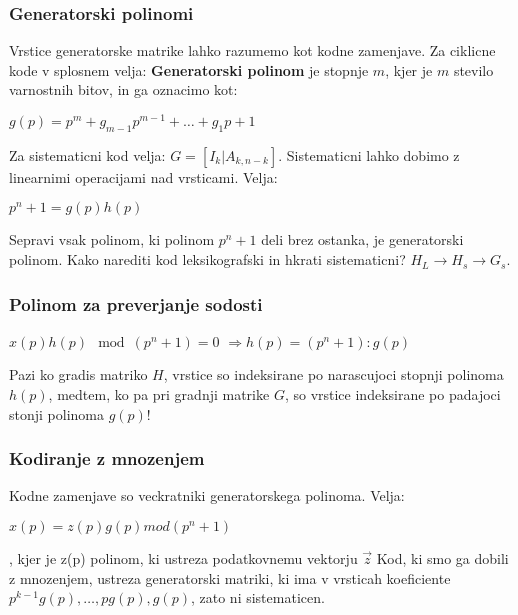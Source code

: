\documentclass{article}
\begin{document}
\begin{multicols}{4}
\subsubsection{Generatorski polinomi}
Vrstice generatorske matrike lahko razumemo kot kodne zamenjave.
Za ciklicne kode v splosnem velja: \textbf{Generatorski polinom} je stopnje $m$, kjer je $m$ stevilo
varnostnih bitov, in ga oznacimo kot:
\begin{center}
    \begin{math}
        g(p) = p^m + g_{m-1}p^{m-1} + \dots + g_1p + 1
    \end{math}
\end{center}
Za sistematicni kod velja: $G = [I_k | A_{k, n-k}]$.
Sistematicni lahko dobimo z linearnimi operacijami nad vrsticami.
Velja:
\begin{center}
    \begin{math}
        p^n + 1 = g(p)h(p)
    \end{math}
\end{center}
Sepravi vsak polinom, ki polinom $p^n + 1$ deli brez ostanka, je generatorski polinom.
Kako narediti kod leksikografski in hkrati sistematicni? $H_L \rightarrow H_s \rightarrow G_s$.

\subsubsection{Polinom za preverjanje sodosti}
\begin{center}
    \begin{math}
        x(p)h(p) \mod(p^n + 1) = 0   
    \end{math}
    \begin{math}
        \Rightarrow h(p) = (p^n + 1) : g(p)
    \end{math}
\end{center}
Pazi ko gradis matriko $H$, vrstice so indeksirane po narascujoci stopnji polinoma $h(p)$, medtem,
ko pa pri gradnji matrike $G$, so vrstice indeksirane po padajoci stonji polinoma $g(p)$!


\subsubsection{Kodiranje z mnozenjem}
Kodne zamenjave so veckratniki generatorskega polinoma.
Velja:
\begin{center}
    \begin{math}
        x(p) = z(p) g(p) mod (p^n + 1)
    \end{math}
\end{center}, kjer je z(p) polinom, ki ustreza podatkovnemu vektorju $\vec{z}$
Kod, ki smo ga dobili z mnozenjem, ustreza generatorski matriki, ki ima v vrsticah
koeficiente $p^{k-1}g(p), \dots, pg(p), g(p)$, zato ni sistematicen.


\end{multicols}
\end{document}

